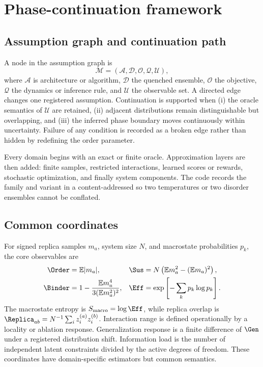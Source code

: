 \section{Phase-continuation framework}

\subsection{Assumption graph and continuation path}

A node in the assumption graph is
\[
  \mathcal{M}=(\mathcal{A},\mathcal{D},\mathcal{O},\mathcal{Q},\mathcal{U}),
\]
where \(\mathcal{A}\) is architecture or algorithm, \(\mathcal{D}\) the quenched
ensemble, \(\mathcal{O}\) the objective, \(\mathcal{Q}\) the dynamics or inference
rule, and \(\mathcal{U}\) the observable set. A directed edge changes one registered
assumption. Continuation is supported when (i) the oracle semantics of \(\mathcal{U}\)
are retained, (ii) adjacent distributions remain distinguishable but overlapping, and
(iii) the inferred phase boundary moves continuously within uncertainty. Failure of any
condition is recorded as a broken edge rather than hidden by redefining the order parameter.

Every domain begins with an exact or finite oracle. Approximation layers are then added:
finite samples, restricted interactions, learned scores or rewards, stochastic optimization,
and finally system components. The code records the family and variant in a content-addressed
\phasecard{} so two temperatures or two disorder ensembles cannot be conflated.

\subsection{Common coordinates}

For signed replica samples \(m_a\), system size \(N\), and macrostate probabilities
\(p_k\), the core observables are
\begin{align}
  \Order &= \mathbb{E}|m_a|, &
  \Sus &= N\left(\mathbb{E}m_a^2-(\mathbb{E}m_a)^2\right),\\
  \Binder &= 1-\frac{\mathbb{E}m_a^4}{3(\mathbb{E}m_a^2)^2}, &
  \Eff &= \exp\left[-\sum_k p_k\log p_k\right].
\end{align}
The macrostate entropy is \(S_{\rm macro}=\log \Eff\), while replica overlap is
\(\Replica_{ab}=N^{-1}\sum_i z_i^{(a)}z_i^{(b)}\). Interaction range is defined
operationally by a locality or ablation response. Generalization response is a finite
difference of \(\Gen\) under a registered distribution shift. Information load is the
number of independent latent constraints divided by the active degrees of freedom. These
coordinates have domain-specific estimators but common semantics.

